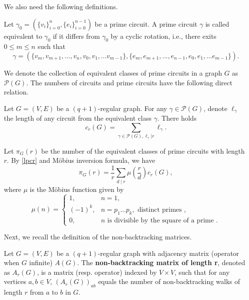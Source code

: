 \documentclass{article}
\begin{document}
We also need the following definitions.

\begin{definition}\label{primecircuitequi}
    Let $\gamma_0=(\{v_i\}_{i=0}^{n}, \{e_i\}_{i=0}^{n-1})$ be a prime circuit. A prime circuit $\gamma$ is called equivalent to $\gamma_0$ if it differs from $\gamma_0$ by a cyclic rotation, i.e., there exits $0\leq m\leq n$ such that 
$$\gamma=(\{v_{m},v_{m+1},...,v_n,v_0,v_1,...v_{m-1}\}, 
\{e_{m},e_{m+1},...,e_{n-1},e_0,e_1,...e_{m-1}\}).$$
\end{definition}
 We denote the collection of equivalent classes of prime circuits in a graph $G$ as $\mathcal{P}(G)$. The numbers of circuits and prime circuits have the following direct relation.
\begin{lemma}\label{primecir}
Let $G=(V,E)$ be a $(q+1)\text{-}$regular graph. For any $\gamma\in \mathcal{P}(G)$, denote $\ell_\gamma$ the length of any circuit from the equivalent class $\gamma$. There holds
\begin{equation}\label{lpcr}
    c_r(G)=\sum_{\gamma\in \mathcal{P}(G), \ell_\gamma|r}\ell_\gamma.
\end{equation}
\end{lemma}
Let $\pi_{G}(r)$ be the number of the equivalent classes of prime circuits with length $r$. By \eqref{lpcr} and Möbius inversion formula, we have 
\begin{equation}\label{primeandcr}
 \pi_{G}(r)=\frac{1}{r} \sum_{d \mid r} \mu\left(\frac{r}{d}\right) c_{r}(G),
\end{equation}
where $\mu$ is the Möbius function given by
$$
\mu(n)= \begin{cases}1, & n=1, \\ (-1)^k, & n=p_1 \ldots p_k, \text { distinct primes }, \\ 0, & n \text { is divisible by the square of a prime }.\end{cases}
$$



Next, we recall the definition of the non-backtracking matrices.
\begin{definition}
Let $G=(V,E)$ be a $(q+1)$-regular graph with adjacency matrix (operator when $G$ infinite) $A(G)$. The \textbf{non-backtracking matrix of length r}, denoted as $A_r(G)$, is a matrix (resp. operator) indexed by $V \times V$, such that for any vertices $a,b \in V$, $(A_r(G))_{ab}$ equals the number of non-backtracking walks of length $r$ from $a$ to $b$ in $G$. 
\end{definition}
\end{document}

